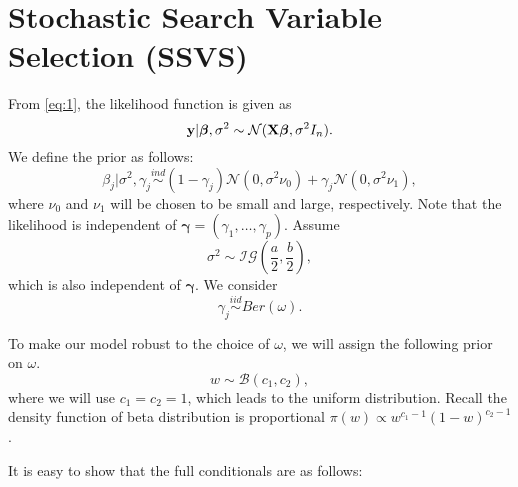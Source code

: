 \documentclass[]{book}
\begin{document}
\hypertarget{stochastic-search-variable-selection-ssvs}{%
\chapter{Stochastic Search Variable Selection (SSVS)}\label{stochastic-search-variable-selection-ssvs}}

From \eqref{eq:1}, the likelihood function is given as
\[
{\bf y}|{\boldsymbol \beta}, \sigma^2 \sim \mathcal{N}({\bf X}{\boldsymbol \beta}, \sigma^2I_n).
\]
We define the prior as follows:
\[
\beta_j|\sigma^2,\gamma_j \stackrel{ind}{\sim} (1-\gamma_j) \mathcal{N}(0, \sigma^2\nu_0) + \gamma_j\mathcal{N}(0,\sigma^2\nu_1),
\]
where \(\nu_0\) and \(\nu_1\) will be chosen to be small and large, respectively. Note that the likelihood is independent of \({\boldsymbol \gamma}=(\gamma_1,\ldots,\gamma_p)\).
Assume
\[
\sigma^2 \sim \mathcal{IG}(\frac{a}{2}, \frac{b}{2}),
\]
which is also independent of \({\boldsymbol \gamma}\). We consider
\[
\gamma_j \stackrel{iid}{\sim} Ber(\omega).
\]

To make our model robust to the choice of \(\omega\), we will assign the following prior on \(\omega\).
\[w\sim \mathcal{B}(c_1,c_2),\]
where we will use \(c_1=c_2=1\), which leads to the uniform distribution. Recall the density function of beta distribution is proportional \(\pi(w)\propto w^{c_1-1}(1-w)^{c_2-1}\).

It is easy to show that the full conditionals are as follows:
\end{document}
